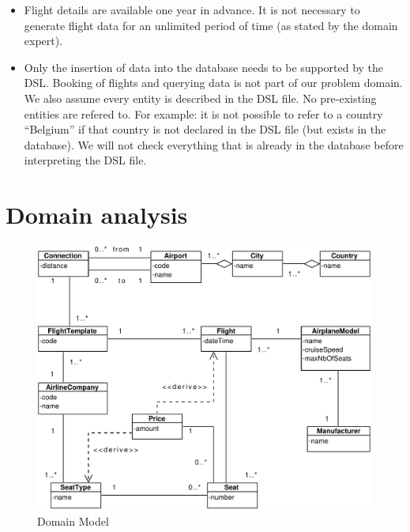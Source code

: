 \documentclass[a4paper]{article}
\begin{document}
\begin{itemize}
\item Flight details are available one year in advance. It is not necessary to generate flight data for an unlimited period of time (as stated by the domain expert).\\

\item Only the insertion of data into the database needs to be supported by the DSL.
Booking of flights and querying data is not part of our problem domain.
We also assume every entity is described in the DSL file.
No pre-existing entities are refered to.
For example: it is not possible to refer to a country ``Belgium'' if that country is not declared in the DSL file (but exists in the database).
We will not check everything that is already in the database before interpreting the DSL file.\\


\end{itemize}

\section{Domain analysis}
\label{sec:domain-analysis}

\begin{figure}[ht!]
  \includegraphics[width=1.0\textwidth]{../analysis/domainModel.pdf}
  \caption{Domain Model}\label{fig:domain-model}
\end{figure}
\end{document}
